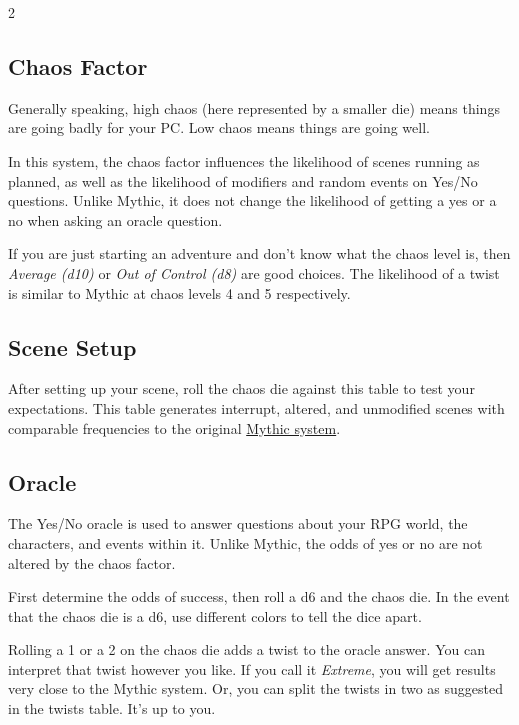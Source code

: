 \begin{multicols}{2}
\clearfloat{}

\subsection{Chaos Factor}
Generally speaking, high chaos (here represented by a smaller die) means things
are going badly for your PC\@. Low chaos means things are going well.

In this system, the chaos factor influences the likelihood of scenes running as
planned, as well as the likelihood of modifiers and random events on Yes/No
questions. Unlike Mythic, it does not change the likelihood of getting a yes or
a no when asking an oracle question.

If you are just starting an adventure and don't know what the chaos level is,
then \emph{Average (d10)} or \emph{Out of Control (d8)} are good choices.
The likelihood of a twist is similar to Mythic at chaos levels 4 and 5 respectively.



\subsection{Scene Setup}
After setting up your scene, roll the chaos die against this table to test your
expectations. This table generates interrupt, altered, and unmodified scenes
with comparable frequencies to the original
\href{https://www.wordmillgames.com/mythic-gme.html}{Mythic system}.


\subsection{Oracle}
The Yes/No oracle is used to answer questions about your RPG world, the
characters, and events within it. Unlike Mythic, the odds of yes or no are not
altered by the chaos factor.

First determine the odds of success, then roll a d6 and the chaos die. In the
event that the chaos die is a d6, use different colors to tell the dice apart.

Rolling a 1 or a 2 on the chaos die adds a twist to the oracle answer. You can 
interpret that twist however you like. If you call it \emph{Extreme}, you will 
get results very close to the Mythic system. Or, you can split the twists in 
two as suggested in the twists table. It's up to you.



\vfill
\end{multicols}

